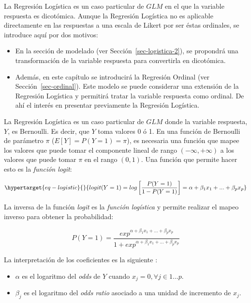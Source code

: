 \documentclass[
  12pt,
  a4paper,
  extrafontsizes,
  onecolumn,
  openright,
  table]{memoir}
\providecommand{\tightlist}{%
  \setlength{\itemsep}{0pt}\setlength{\parskip}{0pt}}\usepackage{longtable,booktabs,array}
\begin{document}
La \gls{Regresión Logística} es un caso particular de \(GLM\) en el que
la variable respuesta es dicotómica. Aunque la Regresión Logística no es
aplicable directamente en las respuestas a una escala de Likert por ser
éstas ordinales, se introduce aquí por dos motivos:

\begin{itemize}
\tightlist
\item
  En la sección de modelado (ver Sección~\ref{sec-logistica-2}), se
  propondrá una transformación de la variable respuesta para convertirla
  en dicotómica.
\item
  Además, en este capítulo se introducirá la Regresión Ordinal (ver
  Sección~\ref{sec-ordinal}). Este modelo se puede considerar una
  extensión de la Regresión Logística y permitirá tratar la variable
  respuesta como ordinal. De ahí el interés en presentar previamente la
  Regresión Logística.
\end{itemize}

La \gls{Regresión Logística} \autocite[ver][pp.~68-69]{agresti_2018} es
un caso particular de \(GLM\) donde la variable respuesta, \(Y\), es
Bernoulli. Es decir, que \(Y\) toma valores 0 ó 1. En una función de
Bernoulli de parámetro \(\pi\) (\(E[Y] = P(Y=1) = \pi\)), es necesaria
una función que mapee los valores que puede tomar el componente lineal
de rango \((-\infty, +\infty)\) a los valores que puede tomar \(\pi\) en
el rango \((0, 1)\). Una función que permite hacer esto es la
\emph{\gls{función logit}}:

\begin{equation}\protect\hypertarget{eq-logistic}{}{
logit(Y=1) = log \left[\frac{P(Y=1)}{1-P(Y=1)} \right] = \alpha+\beta_1x_1+...+\beta_px_p
}\label{eq-logistic}\end{equation}

La inversa de la función \emph{logit} es la
\emph{\gls{función logística}} y permite realizar el mapeo inverso para
obtener la probabilidad:

\[
P(Y=1) = \frac{exp^{\alpha+\beta_1x_1+...+\beta_px_p}}{1 + exp^{\alpha+\beta_1x_1+...+\beta_px_p}}
\]

La interpretación de los coeficientes es la siguiente
\autocite[ver][p.~260]{frienly2015}:

\begin{itemize}
\tightlist
\item
  \(\alpha\) es el logaritmo del \emph{\gls{odds}} de \(Y\) cuando
  \(x_j=0, \forall j \in 1...p\).
\item
  \(\beta_j\) es el logaritmo del \emph{\gls{odds ratio}} asociado a una
  unidad de incremento de \(x_j\).
\end{itemize}
\end{document}
